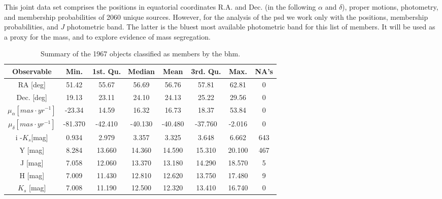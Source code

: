 This joint data set comprises the positions in equatorial coordinates R.A. and Dec. (in the following $\alpha$ and $\delta$), proper motions, photometry, and membership probabilities of 2060 unique sources. 
However, for the analysis of the \gls{psd} we work only with the positions, membership probabilities, and $J$ photometric band. The latter is the bluest most available photometric band for this list of members. It will be used as a proxy for the mass, and to explore evidence of mass segregation.

\begin{table}[ht!]
\caption{Summary of the 1967 objects classified as members by the \gls{bhm}.}
\begin{center}
\begin{tabular}{|c|c|c|c|c|c|c|c|}
\hline
Observable & Min. & 1st. Qu. & Median & Mean & 3rd. Qu. & Max. & NA's \\
\hline
\hline
RA [deg]   & 51.42 &  55.67 & 56.69 &  56.76  & 57.81  & 62.81 & 0\\
Dec. [deg] &19.13  & 23.11  & 24.10 &  24.13  & 25.22 &  29.56 &0\\
$\mu_{\alpha} [mas\cdot yr^{-1}]$&-23.34  & 14.59  & 16.32 &  16.73 &  18.37  & 53.84&0\\
$\mu_{\delta} [mas\cdot yr^{-1}]$&-81.370 &-42.410& -40.130& -40.480& -37.760&  -2.016&0\\
i -$K_s$[mag] &  0.934 &  2.979  & 3.357    & 3.325   &  3.648  &6.662   &643\\
Y [mag]           &   8.284 & 13.660 & 14.360  &14.590  &15.310  &20.100 &   467 \\
J [mag]           &   7.058 & 12.060& 13.370  & 13.180 & 14.290 & 18.570&      5\\
H [mag]          &   7.009 & 11.430 & 12.810  & 12.620 & 13.750 & 17.480&      9 \\
$K_s$ [mag]  &   7.008 & 11.190 & 12.500  & 12.320 & 13.410 & 16.740&    0\\
\hline
\end{tabular}
\end{center}
\label{tab:hmps}
\end{table}%

